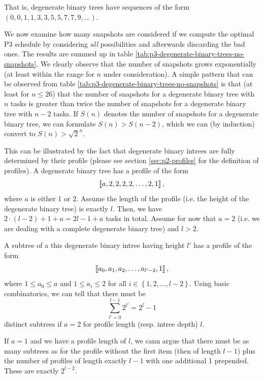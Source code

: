 That is, degenerate binary trees have sequences of the form $(0,0,1,1,3,3,5,5,7,7,9,\dots)$.

We now examine how many snapshots are considered if we compute the optimal P3 schedule by considering \emph{all} possibilities and afterwards discarding the bad ones. The results are summed up in table \ref{tab:p3-degenerate-binary-trees-no-snapshots}. We clearly observe that the number of snapshots grows exponentially (at least within the range for $n$ under consideration). A simple pattern that can be observed from table \ref{tab:p3-degenerate-binary-trees-no-snapshots} is that (at least for $n\leq 26$) that the number of snapshots for a degenerate binary tree with $n$ tasks is greater than twice the number of snapshots for a degenerate binary tree with $n-2$ tasks. If $S(n)$ denotes the number of snapshots for a degenerate binary tree, we can formulate $S(n)>S(n-2)$, which we can (by induction) convert to $S(n) > \sqrt 2 ^ n$.

This can be illustrated by the fact that degenerate binary intrees are fully determined by their profile (please see section \ref{sec:p2-profiles} for the definition of profiles). A degenerate binary tree has a profile of the form
\begin{equation*}
  \left\llbracket a,2,2,2,2,\dots,2,1 \right\rrbracket,
\end{equation*}
where $a$ is either $1$ or $2$. Assume the length of the profile (i.e. the height of the degenerate binary tree) is exactly $l$. Then, we have $2\cdot(l-2)+1+a = 2l-1+a$ tasks in total. Assume for now that $a=2$ (i.e. we are dealing with a complete degenerate binary tree) and $l>2$.

A subtree of a this degenerate binary intree having height $l'$ has a profile of the form
\begin{equation*}
  \left\llbracket a_0,a_1,a_2,\dots,a_{l'-2},1 \right\rrbracket,
\end{equation*}
where $1\leq a_0\leq a$ and $1\leq a_i \leq 2$ for all $i\in\left\{ 1,2,\dots,l-2 \right\}$. Using basic combinatorics, we can tell that there must be
\begin{equation*}
  \sum_{l'=0}^{l-1} 2^{l'} = 2^{l} -1
\end{equation*}
distinct subtrees if $a=2$ for profile length (resp. intree depth) $l$.

If $a=1$ and we have a profile length of $l$, we cann argue that there must be as many subtrees as for the profile without the first item (then of length $l-1$) plus the number of profiles of length exactly $l-1$ with one additional 1 prepended. These are exactly $2^{l-2}$.

